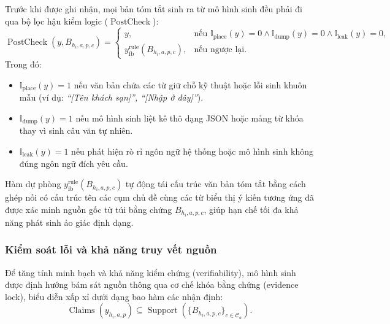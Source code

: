 Trước khi được ghi nhận, mọi bản tóm tắt sinh ra từ mô hình sinh đều phải đi qua bộ lọc hậu kiểm logic ($\operatorname{PostCheck}$):
\begin{equation}
\operatorname{PostCheck}(y, B_{h_i,a,p,c}) = \begin{cases}
y, & \text{nếu } \mathbb{I}_{\mathrm{place}}(y) = 0 \land \mathbb{I}_{\mathrm{dump}}(y) = 0 \land \mathbb{I}_{\mathrm{leak}}(y) = 0, \\
y_{\mathrm{fb}}^{\mathrm{rule}}(B_{h_i,a,p,c}), & \text{nếu ngược lại}.
\end{cases}
\label{eq:method1-postcheck-logic}
\end{equation}
Trong đó:
\begin{itemize}[leftmargin=1.2cm]
    \item $\mathbb{I}_{\mathrm{place}}(y) = 1$ nếu văn bản chứa các từ giữ chỗ kỹ thuật hoặc lỗi sinh khuôn mẫu (ví dụ: \textit{``[Tên khách sạn]'', ``[Nhập ở đây]''}).
    \item $\mathbb{I}_{\mathrm{dump}}(y) = 1$ nếu mô hình sinh liệt kê thô dạng JSON hoặc mảng từ khóa thay vì sinh câu văn tự nhiên.
    \item $\mathbb{I}_{\mathrm{leak}}(y) = 1$ nếu phát hiện rò rỉ ngôn ngữ hệ thống hoặc mô hình sinh không đúng ngôn ngữ đích yêu cầu.
\end{itemize}
Hàm dự phòng $y_{\mathrm{fb}}^{\mathrm{rule}}(B_{h_i,a,p,c})$ tự động tái cấu trúc văn bản tóm tắt bằng cách ghép nối có cấu trúc tên các cụm chủ đề cùng các từ biểu thị ý kiến tương ứng đã được xác minh nguồn gốc từ túi bằng chứng $B_{h_i,a,p,c}$, giúp hạn chế tối đa khả năng phát sinh ảo giác định dạng.

\subsubsection{Kiểm soát lỗi và khả năng truy vết nguồn}
\label{subsubsec:method1-error-control-and-traceability}

Để tăng tính minh bạch và khả năng kiểm chứng (verifiability), mô hình sinh được định hướng bám sát nguồn thông qua cơ chế khóa bằng chứng (evidence lock), biểu diễn xấp xỉ dưới dạng bao hàm các nhận định:
\begin{equation}
\operatorname{Claims}(y_{h_i,a,p}) \subseteq \operatorname{Support} \left( \{B_{h_i,a,p,c}\}_{c\in \mathcal{C}_a} \right).
\label{eq:method1-evidence-lock}
\end{equation}


